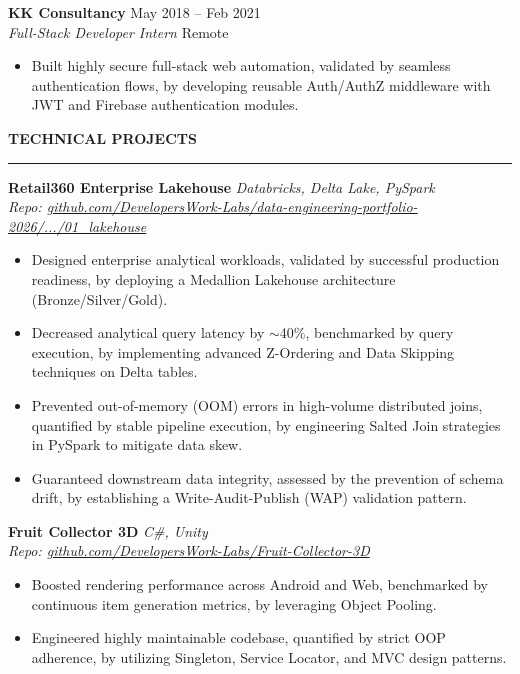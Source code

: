 \documentclass[10pt, letterpaper]{article}
\newcommand{\resumesection}[1]{
  \vspace{8pt}
  \noindent \textbf{\large \uppercase{#1}} \\
  \vspace{-8pt}
  \hrule
  \vspace{6pt}
}
\begin{document}
\vspace{4pt}

\noindent \textbf{KK Consultancy} \hfill May 2018 -- Feb 2021 \\
\textit{Full-Stack Developer Intern} \hfill Remote
\begin{itemize}
    \setlength{\itemsep}{1pt}
    \item Built highly secure full-stack web automation, validated by seamless authentication flows, by developing reusable Auth/AuthZ middleware with JWT and Firebase authentication modules.
\end{itemize}

\resumesection{Technical Projects}

\noindent \textbf{Retail360 Enterprise Lakehouse} \hfill \textit{Databricks, Delta Lake, PySpark} \\
\textit{Repo: \href{https://github.com/DevelopersWork-Labs/data-engineering-portfolio-2026/tree/main/projects/01_lakehouse}{github.com/DevelopersWork-Labs/data-engineering-portfolio-2026/.../01\_lakehouse}}
\begin{itemize}
    \setlength{\itemsep}{1pt}
    \item Designed enterprise analytical workloads, validated by successful production readiness, by deploying a Medallion Lakehouse architecture (Bronze/Silver/Gold).
    \item Decreased analytical query latency by $\sim$40\%, benchmarked by query execution, by implementing advanced Z-Ordering and Data Skipping techniques on Delta tables.
    \item Prevented out-of-memory (OOM) errors in high-volume distributed joins, quantified by stable pipeline execution, by engineering Salted Join strategies in PySpark to mitigate data skew.
    \item Guaranteed downstream data integrity, assessed by the prevention of schema drift, by establishing a Write-Audit-Publish (WAP) validation pattern.
\end{itemize}

\vspace{2pt}

\noindent \textbf{Fruit Collector 3D} \hfill \textit{C\#, Unity} \\
\textit{Repo: \href{https://github.com/DevelopersWork-Labs/Fruit-Collector-3D}{github.com/DevelopersWork-Labs/Fruit-Collector-3D}}
\begin{itemize}
    \setlength{\itemsep}{1pt}
    \item Boosted rendering performance across Android and Web, benchmarked by continuous item generation metrics, by leveraging Object Pooling.
    \item Engineered highly maintainable codebase, quantified by strict OOP adherence, by utilizing Singleton, Service Locator, and MVC design patterns.
\end{itemize}
\end{document}
